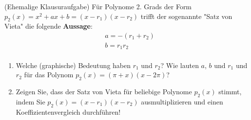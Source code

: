 \item (Ehemalige Klausuraufgabe) Für Polynome 2. Grads der Form $p_2(x)=x^2+ax+b = (x-r_1)(x-r_2)$ trifft der sogenannte "Satz von Vieta" die folgende \textbf{Aussage}:
\begin{align*}
&a = -(r_1+r_2)\\
&b= r_1r_2\\
\end{align*}
\begin{enumerate}[label=(\alph*)]
\item Welche (graphische) Bedeutung haben $r_1$ und $r_2$? Wie lauten $a$, $b$ und $r_1$ und $r_2$ für das Polynom $p_2(x) = (\pi+x)(x-2\pi)$?
\item Zeigen Sie, dass der Satz von Vieta für beliebige Polynome $p_2(x)$ stimmt, indem Sie $p_2(x)=(x-r_1)(x-r_2)$ ausmultiplizieren
und einen Koeffizientenvergleich durchführen!
\end{enumerate}

